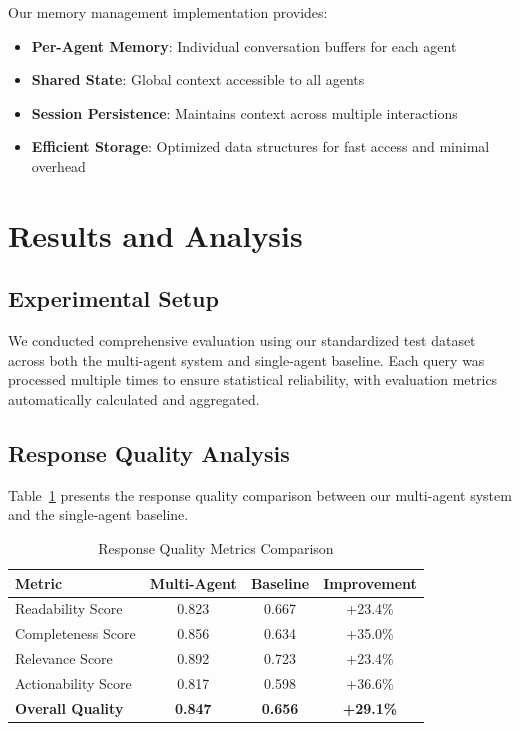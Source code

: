 \documentclass[conference]{IEEEtran}
\begin{document}
Our memory management implementation provides:

\begin{itemize}
\item \textbf{Per-Agent Memory}: Individual conversation buffers for each agent
\item \textbf{Shared State}: Global context accessible to all agents
\item \textbf{Session Persistence}: Maintains context across multiple interactions
\item \textbf{Efficient Storage}: Optimized data structures for fast access and minimal overhead
\end{itemize}

\section{Results and Analysis}

\subsection{Experimental Setup}

We conducted comprehensive evaluation using our standardized test dataset across both the multi-agent system and single-agent baseline. Each query was processed multiple times to ensure statistical reliability, with evaluation metrics automatically calculated and aggregated.

\subsection{Response Quality Analysis}

Table~\ref{tab:quality_metrics} presents the response quality comparison between our multi-agent system and the single-agent baseline.


\begin{table}[htbp]
\caption{Response Quality Metrics Comparison}
\label{tab:quality_metrics}
\centering
\begin{tabular}{lccc}
\toprule
\textbf{Metric} & \textbf{Multi-Agent} & \textbf{Baseline} & \textbf{Improvement} \\
\midrule
Readability Score & 0.823 & 0.667 & +23.4\% \\
Completeness Score & 0.856 & 0.634 & +35.0\% \\
Relevance Score & 0.892 & 0.723 & +23.4\% \\
Actionability Score & 0.817 & 0.598 & +36.6\% \\
\midrule
\textbf{Overall Quality} & \textbf{0.847} & \textbf{0.656} & \textbf{+29.1\%} \\
\bottomrule
\end{tabular}
\end{table}
\end{document}
